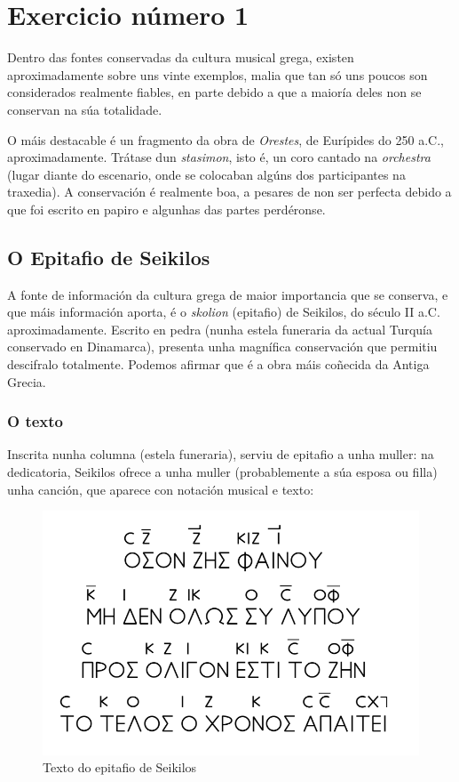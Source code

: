 %
%
\section{Exercicio número 1}

Dentro das fontes conservadas da cultura musical grega, existen aproximadamente sobre uns vinte exemplos, malia que tan só uns poucos son considerados realmente fiables, en parte debido a que a maioría deles non se conservan na súa totalidade. 

O máis destacable é un fragmento da obra de \textit{Orestes}, de Eurípides do 250 a.C., aproximadamente. Trátase dun \textit{stasimon}, isto é, un coro cantado na \textit{orchestra} (lugar diante do escenario, onde se colocaban algúns dos participantes na traxedia). A conservación é realmente boa, a pesares de non ser perfecta debido a que foi escrito en papiro e algunhas das partes perdéronse.

\subsection*{O Epitafio de Seikilos}

A fonte de información da cultura grega de maior importancia que se conserva, e que máis información aporta, é o \textit{skolion} (epitafio) de Seikilos, do século II a.C. aproximadamente. Escrito en pedra (nunha estela funeraria da actual Turquía conservado en Dinamarca), presenta unha magnífica conservación que permitiu descifralo totalmente. Podemos afirmar que é a obra máis coñecida da Antiga Grecia.

\subsubsection*{O texto}

Inscrita nunha columna (estela funeraria), serviu de epitafio a unha muller: na dedicatoria, Seikilos ofrece a unha muller (probablemente a súa esposa ou filla) unha canción, que aparece con notación musical e texto:

\begin{figure}[htp]
\centering
\includegraphics[scale=1.00]{images/Seikilos-Ejercicio-03.png}
\caption{Texto do epitafio de Seikilos}
\label{Seikilos-texto}
\end{figure}

